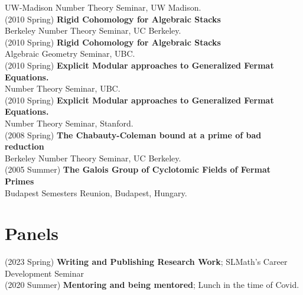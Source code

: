 \documentclass[margin,line]{res}
\begin{document}
\begin{resume}
 UW-Madison Number Theory Seminar, UW Madison.
\vspace{.05cm}\\
(2010 Spring) \textbf{Rigid Cohomology for Algebraic Stacks}\\
 Berkeley Number Theory Seminar, UC Berkeley.
\vspace{.05cm}\\
(2010 Spring) \textbf{Rigid Cohomology for Algebraic Stacks}\\
Algebraic Geometry Seminar, UBC.
\vspace{.05cm}\\
(2010 Spring) \textbf{Explicit Modular approaches to Generalized Fermat Equations.}\\
 Number Theory Seminar, UBC.
\vspace{.05cm}\\
(2010 Spring) \textbf{Explicit Modular approaches to Generalized Fermat Equations.}\\
 Number Theory Seminar, Stanford.
\vspace{.05cm}\\
(2008 Spring) \textbf{The Chabauty-Coleman bound at a prime of bad reduction}\\
 Berkeley Number Theory Seminar, UC Berkeley.
\vspace{.05cm}\\
(2005 Summer) \textbf{The Galois Group of Cyclotomic Fields of Fermat Primes}\\
Budapest Semesters Reunion, Budapest, Hungary. 
\vspace{.05cm}\\
  
  
\section{\sc Panels}
(2023 Spring) \textbf{ Writing and Publishing Research Work};
SLMath's Career Development Seminar
\vspace{.05cm}\\  
(2020 Summer) \textbf{Mentoring and being mentored};
Lunch in the time of Covid. 
\vspace{.05cm}\\


\end{resume}
\end{document}
